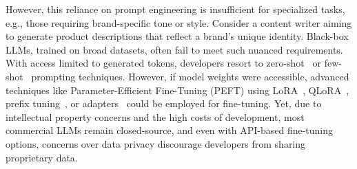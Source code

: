 However, this reliance on prompt engineering is insufficient for specialized tasks, e.g., those requiring brand-specific tone or style. Consider a content writer aiming to generate product descriptions that reflect a brand’s unique identity. Black-box LLMs, trained on broad datasets, often fail to meet such nuanced requirements. With access limited to generated tokens, developers resort to zero-shot~\citep{kojima2022large} or few-shot~\citep{song2023llm} prompting techniques. However, if model weights were accessible, advanced techniques like Parameter-Efficient Fine-Tuning (PEFT) using LoRA~\citep{hu2021lora}, QLoRA~\citep{dettmers2024qlora}, prefix tuning~\citep{li-liang-2021-prefix}, or adapters~\citep{hu-etal-2023-llm} could be employed for fine-tuning. Yet, due to intellectual property concerns and the high costs of development, most commercial LLMs remain closed-source, and even with API-based fine-tuning options, concerns over data privacy discourage developers from sharing proprietary data.



